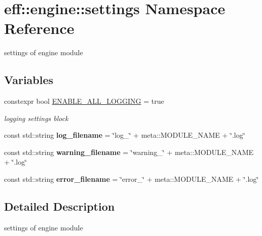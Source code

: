 \hypertarget{namespaceeff_1_1engine_1_1settings}{}\section{eff\+:\+:engine\+:\+:settings Namespace Reference}
\label{namespaceeff_1_1engine_1_1settings}


settings of engine module  


\subsection*{Variables}
\begin{DoxyCompactItemize}
\item 
\mbox{\label{namespaceeff_1_1engine_1_1settings_a566da835cb7a96749ea87523ee945d50}} 
constexpr bool \hyperlink{namespaceeff_1_1engine_1_1settings_a566da835cb7a96749ea87523ee945d50}{E\+N\+A\+B\+L\+E\+\_\+\+A\+L\+L\+\_\+\+L\+O\+G\+G\+I\+NG} = true
\begin{DoxyCompactList}\small\item\em logging settings block \end{DoxyCompactList}\item 
\mbox{\label{namespaceeff_1_1engine_1_1settings_adcc5417968afb98dfe13cde1350577be}} 
const std\+::string {\bfseries log\+\_\+filename} = \char`\"{}log\+\_\+\char`\"{} + meta\+::\+M\+O\+D\+U\+L\+E\+\_\+\+N\+A\+ME + \char`\"{}.log\char`\"{}
\item 
\mbox{\label{namespaceeff_1_1engine_1_1settings_a969ae9f737f98c4f34d815cd30fe3f98}} 
const std\+::string {\bfseries warning\+\_\+filename} = \char`\"{}warning\+\_\+\char`\"{} + meta\+::\+M\+O\+D\+U\+L\+E\+\_\+\+N\+A\+ME + \char`\"{}.log\char`\"{}
\item 
\mbox{\label{namespaceeff_1_1engine_1_1settings_a23c64545f1401bebdc1ec359bf69913e}} 
const std\+::string {\bfseries error\+\_\+filename} = \char`\"{}error\+\_\+\char`\"{} + meta\+::\+M\+O\+D\+U\+L\+E\+\_\+\+N\+A\+ME + \char`\"{}.log\char`\"{}
\end{DoxyCompactItemize}


\subsection{Detailed Description}
settings of engine module 